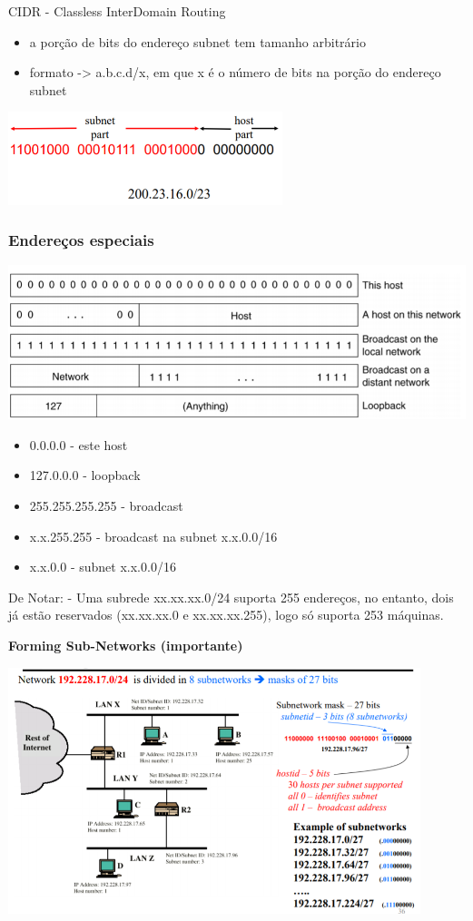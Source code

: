 \documentclass{article}
\begin{document}
CIDR - Classless InterDomain Routing
\begin{itemize}
    \item a porção de bits do endereço subnet tem tamanho arbitrário
    \item formato -> a.b.c.d/x, em que x é o número de bits na porção do endereço subnet
\end{itemize}
\begin{center}
    \includegraphics[width=8cm]{images/RCOM18.png}
\end{center}

\subsubsection{Endereços especiais}
\begin{center}
    \includegraphics[width=14cm]{images/RCOM19.png}
\end{center}
\begin{itemize}
    \item 0.0.0.0 - este host
    \item 127.0.0.0 - loopback
    \item 255.255.255.255 - broadcast
    \item x.x.255.255 - broadcast na subnet x.x.0.0/16
    \item x.x.0.0 - subnet x.x.0.0/16
\end{itemize}

De Notar: - Uma subrede xx.xx.xx.0/24 suporta 255 endereços, no entanto, dois já estão reservados (xx.xx.xx.0 e xx.xx.xx.255), logo só suporta 253 máquinas.

\textbf{Forming Sub-Networks (importante)}
\begin{center}
    \includegraphics[width=12cm]{images/RCOM20.png}
\end{center}
\end{document}
